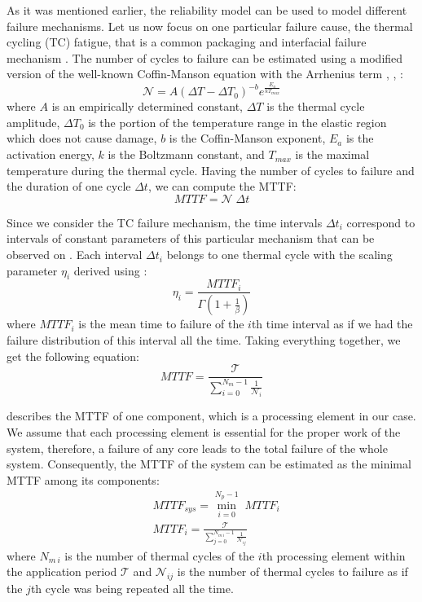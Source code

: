 As it was mentioned earlier, the reliability model can be used to model different failure mechanisms. Let us now focus on one particular failure cause, the thermal cycling (TC) fatigue, that is a common packaging and interfacial failure mechanism \cite{jedec2010}. The number of cycles to failure can be estimated using a modified version of the well-known Coffin-Manson equation with the Arrhenius term \cite{jedec2010}, \cite{xiang2010}, \cite{ciappa2003}:
\begin{equation} \label{eq:cycles-to-failure}
  \mathcal{N} = A (\Delta T - \Delta T_0)^{-b} e^{\frac{E_a}{k T_{max}}}
\end{equation}
where $A$ is an empirically determined constant, $\Delta T$ is the thermal cycle amplitude, $\Delta T_0$ is the portion of the temperature range in the elastic region which does not cause damage, $b$ is the Coffin-Manson exponent, $E_{a}$ is the activation energy, $k$ is the Boltzmann constant, and $T_{max}$ is the maximal temperature during the thermal cycle. Having the number of cycles to failure and the duration of one cycle $\Delta t$, we can compute the MTTF:
\[
  MTTF = \mathcal{N} \; \Delta t
\]

Since we consider the TC failure mechanism, the time intervals $\Delta t_i$ correspond to intervals of constant parameters of this particular mechanism that can be observed on . Each interval $\Delta t_i$ belongs to one thermal cycle with the scaling parameter $\eta_i$ derived using :
\[
  \eta_i = \frac{MTTF_i}{\Gamma(1 + \frac{1}{\beta})}
\]
where $MTTF_i$ is the mean time to failure of the $i$th time interval as if we had the failure distribution of this interval all the time. Taking everything together, we get the following equation:
\begin{equation} \label{eq:one-mttf}
  MTTF = \frac{\mathcal{T}}{\sum_{i=0}^{N_m - 1} \frac{1}{\mathcal{N}_i}}
\end{equation}

 describes the MTTF of one component, which is a processing element in our case. We assume that each processing element is essential for the proper work of the system, therefore, a failure of any core leads to the total failure of the whole system. Consequently, the MTTF of the system can be estimated as the minimal MTTF among its components:
\begin{align}
  & MTTF_{sys} = \min_{i=0}^{N_p - 1} \; MTTF_i \label{eq:mttf-system} \\
  & MTTF_i = \frac{\mathcal{T}}{\sum_{j=0}^{N_{m \: i} - 1} \frac{1}{\mathcal{N}_{ij}}} \nonumber
\end{align}
where $N_{m \: i}$ is the number of thermal cycles of the $i$th processing element within the application period $\mathcal{T}$ and $\mathcal{N}_{ij}$ is the number of thermal cycles to failure as if the $j$th cycle was being repeated all the time.

